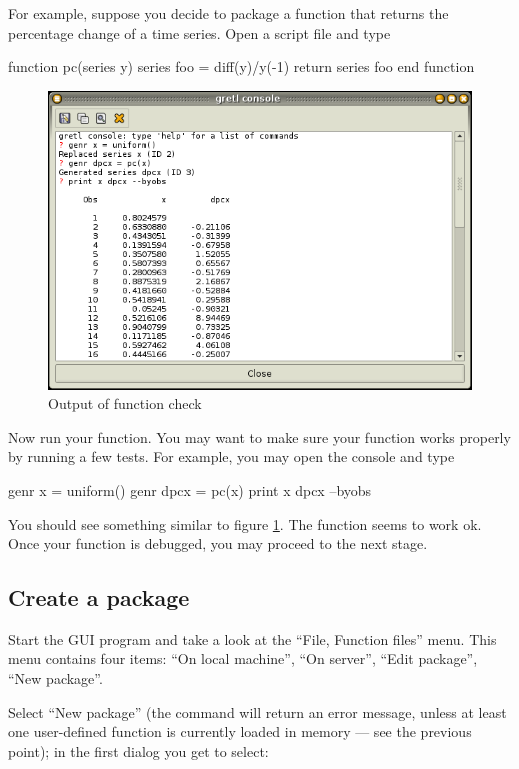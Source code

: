 For example, suppose you decide to package a function that returns the
percentage change of a time series. Open a script file and type
\begin{code}
function pc(series y)
  series foo = diff(y)/y(-1)
  return series foo
end function
\end{code}

\begin{figure}[htbp]
  \centering
  \includegraphics[scale=0.5]{figures/func_check}
  \caption{Output of function check}
  \label{fig:func_check}
\end{figure}

Now run your function. You may want to make sure your function works
properly by running a few tests. For example, you may open the console
and type

\begin{code}
genr x = uniform()
genr dpcx = pc(x)
print x dpcx --byobs
\end{code}

You should see something similar to figure \ref{fig:func_check}. The
function seems to work ok. Once your function is debugged, you
may proceed to the next stage.

\subsection{Create a package}

Start the GUI program and take a look at the ``File, Function files'' menu.
This menu contains four items: ``On local machine'', ``On server'', ``Edit
package'', ``New package''.

Select ``New package'' (the command will return an error message,
unless at least one user-defined function is currently loaded in
memory --- see the previous point); in the first dialog you get to
select:

